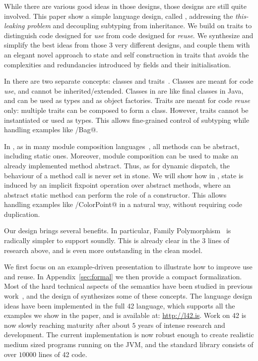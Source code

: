 While there are various good ideas in those designs, those designs are
still quite involved.
This paper show a simple language design, called \name,
addressing the \emph{this-leaking problem} and decoupling subtyping from inheritance.
We build on traits to distinguish code designed for
\emph{use} from code designed for \emph{reuse}.
We synthesize and simplify the best ideas from those $3$ very
different designs, and couple them with an elegant novel approach to
state and self construction in traits that avoids the complexities and redundancies introduced by fields and their initialisation.

In \name there are two separate concepts: classes
and traits~\cite{ducasse2006traits}. Classes are meant for code \emph{use}, and cannot be inherited/extended. Classes in \name are like final classes in
Java, and can be used as types and as object factories. Traits are meant for code \emph{reuse} only: multiple traits can be
composed to form a class. However, traits 
cannot be instantiated or used as types.
This allows fine-grained control of subtyping while handling examples like \Q@Set/Bag@.

In \name, as in many module composition languages~\cite{ancona_zucca_2002},
all methods can be abstract, including static ones.
Moreover, module composition can be used to make
an already implemented method abstract.
Thus, as for dynamic dispatch, the behaviour of a method call is never set in stone.
We will show how in \name, state is induced by an implicit fixpoint operation over abstract methods,
where an abstract static method can perform the role of a constructor.
This allows handling examples like \Q@Point/ColorPoint@ in a natural way, without requiring code duplication.

Our design brings several benefits. In particular, 
Family Polymorphism~\cite{ernst2004expression} is
radically simpler to support soundly.
This is already clear in the $3$ lines of
research above, and is even more outstanding in the clean \name model.

We first focus on an example-driven presentation to illustrate how to
improve use and reuse. 
In Appendix~\ref{sec:formal} we then provide a compact formalization.
Most of the hard technical aspects of the
semantics have been studied in previous 
work~\cite{Bettini:2010:ISP:1774088.1774530,BETTINI2013521,Bettini2015282,KrogdahlMS09,DBLP:journals/taosd/AxelsenSKM12,DBLP:conf/gpce/AxelsenK12,deep,servetto2014meta,fjig},
and the design of \name synthesizes some of these concepts.
The language design ideas have been implemented in the full 42 language, which supports all
the examples we show in the paper, and is available at: \url{http://l42.is}.
Work on 42 is now slowly reaching maturity after about $5$ years of
intense research and development. The current implementation 
is now robust enough to create realistic medium sized programs running 
on the JVM, and the standard library consists of over $10000$ lines of
42 code. 

